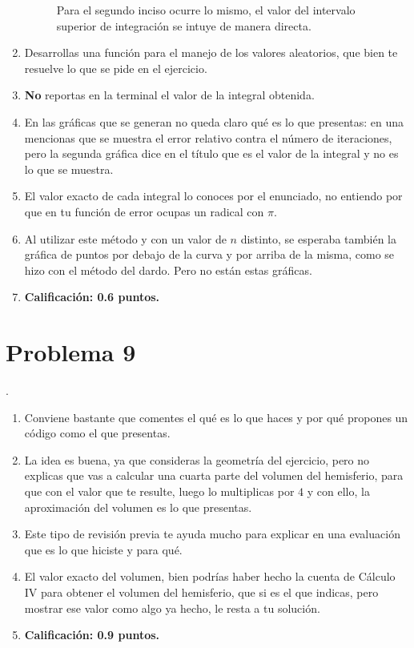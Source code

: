 \begin{enumerate}
\begin{figure}[H]
    \caption{Para el segundo inciso ocurre lo mismo, el valor del intervalo superior de integración se intuye de manera directa.}
\end{figure}
\item Desarrollas una función para el manejo de los valores aleatorios, que bien te resuelve lo que se pide en el ejercicio.
\item \textbf{No} reportas en la terminal el valor de la integral obtenida.
\item En las gráficas que se generan no queda claro qué es lo que presentas: en una mencionas que se muestra el error relativo contra el número de iteraciones, pero la segunda gráfica dice en el título que es el valor de la integral y no es lo que se muestra.
\item El valor exacto de cada integral lo conoces por el enunciado, no entiendo por que en tu función de error ocupas un radical con $\pi$.
\item Al utilizar este método y con un valor de $n$ distinto, se esperaba también la gráfica de puntos por debajo de la curva y por arriba de la misma, como se hizo con el método del dardo. Pero no están estas gráficas.
\item \textbf{Calificación: 0.6 puntos.}
\end{enumerate}

\section{Problema 9}.

\begin{enumerate}
\item Conviene bastante que comentes el qué es lo que haces y por qué propones un código como el que presentas.
\item La idea es buena, ya que consideras la geometría del ejercicio, pero no explicas que vas a calcular una cuarta parte del volumen del hemisferio, para que con el valor que te resulte, luego lo multiplicas por $4$ y con ello, la aproximación del volumen es lo que presentas.
\item Este tipo de revisión previa te ayuda mucho para explicar en una evaluación que es lo que hiciste y para qué.
\item El valor exacto del volumen, bien podrías haber hecho la cuenta de Cálculo IV para obtener el volumen del hemisferio, que si es el que indicas, pero mostrar ese valor como algo ya hecho, le resta a tu solución.
\item \textbf{Calificación: 0.9 puntos.}
\end{enumerate}



